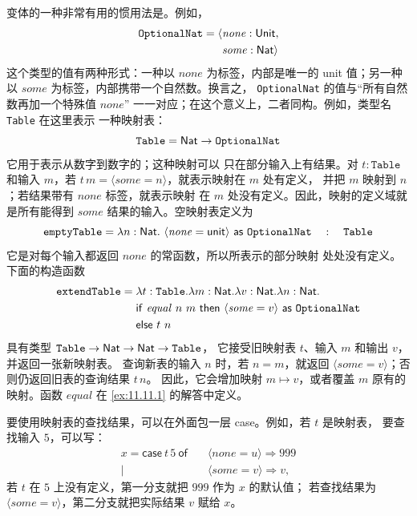 变体的一种非常有用的惯用法是。例如，
\[
\begin{aligned}
\texttt{OptionalNat}
  =\langle&\mathit{none}:\mathsf{Unit},\\
           &\mathit{some}:\mathsf{Nat}\rangle
\end{aligned}
\]
这个类型的值有两种形式：一种以 \(\mathit{none}\) 为标签，内部是唯一的
unit 值；另一种以 \(\mathit{some}\) 为标签，内部携带一个自然数。换言之，
\texttt{OptionalNat} 的值与“所有自然数再加一个特殊值 \(\mathit{none}\)”
一一对应；在这个意义上，二者同构。例如，类型名 \texttt{Table} 在这里表示
一种映射表：
\[
\texttt{Table}=\mathsf{Nat}\to\texttt{OptionalNat}
\]
它用于表示从数字到数字的；这种映射可以
只在部分输入上有结果。对 \(t:\texttt{Table}\) 和输入 \(m\)，若
\(t\,m=\langle\mathit{some}=n\rangle\)，就表示映射在 \(m\) 处有定义，
并把 \(m\) 映射到 \(n\)；若结果带有 \(\mathit{none}\) 标签，就表示映射
在 \(m\) 处没有定义。因此，映射的定义域就是所有能得到 \(\mathit{some}\)
结果的输入。空映射表定义为
\[
\texttt{emptyTable}=
\lambda n:\mathsf{Nat}.\
\langle\mathit{none}=\mathsf{unit}\rangle\
\mathsf{as}\ \texttt{OptionalNat}
\quad:\quad\texttt{Table}
\]
它是对每个输入都返回 \(\mathit{none}\) 的常函数，所以所表示的部分映射
处处没有定义。下面的构造函数
\[
\begin{aligned}
\texttt{extendTable}={}&
\lambda t:\texttt{Table}.\lambda m:\mathsf{Nat}.
\lambda v:\mathsf{Nat}.\lambda n:\mathsf{Nat}.\\
&\mathsf{if}\ \mathit{equal}\ n\ m\
\mathsf{then}\ \langle\mathit{some}=v\rangle\
  \mathsf{as}\ \texttt{OptionalNat}\\
&\mathsf{else}\ t\ n
\end{aligned}
\]
具有类型
\(\texttt{Table}\to\mathsf{Nat}\to\mathsf{Nat}\to\texttt{Table}\)，
它接受旧映射表 \(t\)、输入 \(m\) 和输出 \(v\)，并返回一张新映射表。
查询新表的输入 \(n\) 时，若 \(n=m\)，就返回
\(\langle\mathit{some}=v\rangle\)；否则仍返回旧表的查询结果 \(t\,n\)。
因此，它会增加映射 \(m\mapsto v\)，或者覆盖 \(m\) 原有的映射。函数
\(\mathit{equal}\) 在
\cref{ex:11.11.1} 的解答中定义。

要使用映射表的查找结果，可以在外面包一层 case。例如，若 \(t\) 是映射表，
要查找输入 \(5\)，可以写：
\[
\begin{aligned}
x=\mathsf{case}\ t\,5\ \mathsf{of}\quad
&\langle\mathit{none}=u\rangle\Rightarrow999\\
\mid\;&\langle\mathit{some}=v\rangle\Rightarrow v,
\end{aligned}
\]
若 \(t\) 在 \(5\) 上没有定义，第一分支就把 \(999\) 作为 \(x\) 的默认值；
若查找结果为 \(\langle\mathit{some}=v\rangle\)，第二分支就把实际结果
\(v\) 赋给 \(x\)。

